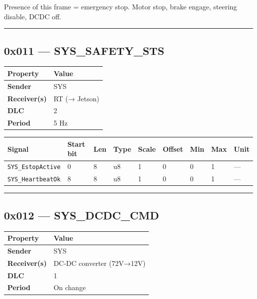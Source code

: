 Presence of this frame = emergency stop. Motor stop, brake engage, steering
disable, DCDC off.

\begin{center}\rule{0.5\linewidth}{0.5pt}\end{center}

\subsection{0x011 --- SYS\_SAFETY\_STS}\label{x011-sys_safety_sts}

\begin{longtable}[]{@{}ll@{}}
\toprule\noalign{}
Property & Value \\
\midrule\noalign{}
\endhead
\bottomrule\noalign{}
\endlastfoot
\textbf{Sender} & SYS \\
\textbf{Receiver(s)} & RT (→ Jetson) \\
\textbf{DLC} & 2 \\
\textbf{Period} & 5 Hz \\
\end{longtable}

\begin{longtable}[]{@{}lllllllll@{}}
\toprule\noalign{}
Signal & Start bit & Len & Type & Scale & Offset & Min & Max & Unit \\
\midrule\noalign{}
\endhead
\bottomrule\noalign{}
\endlastfoot
\texttt{SYS\_EstopActive} & 0 & 8 & u8 & 1 & 0 & 0 & 1 & --- \\
\texttt{SYS\_HeartbeatOk} & 8 & 8 & u8 & 1 & 0 & 0 & 1 & --- \\
\end{longtable}

\begin{center}\rule{0.5\linewidth}{0.5pt}\end{center}

\subsection{0x012 --- SYS\_DCDC\_CMD}\label{x012-sys_dcdc_cmd}

\begin{longtable}[]{@{}ll@{}}
\toprule\noalign{}
Property & Value \\
\midrule\noalign{}
\endhead
\bottomrule\noalign{}
\endlastfoot
\textbf{Sender} & SYS \\
\textbf{Receiver(s)} & DC-DC converter (72V→12V) \\
\textbf{DLC} & 1 \\
\textbf{Period} & On change \\
\end{longtable}

